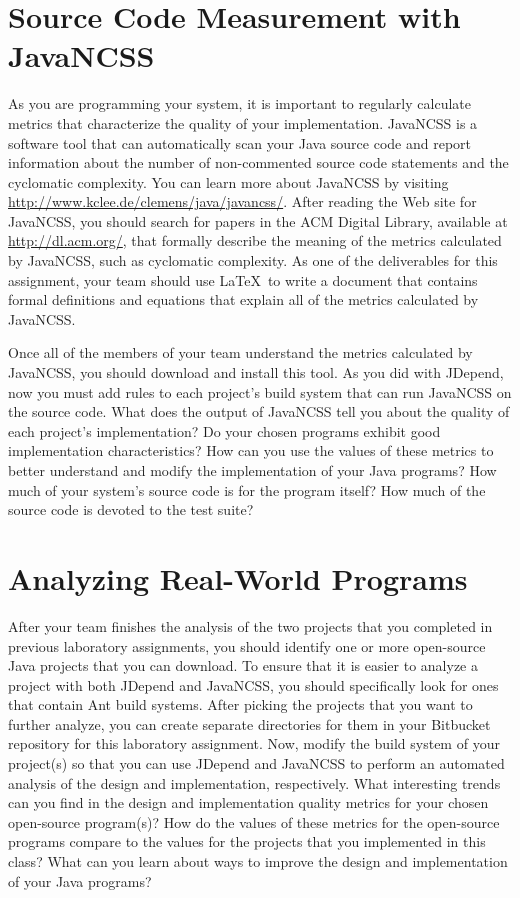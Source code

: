 \section*{Source Code Measurement with JavaNCSS}

As you are programming your system, it is important to regularly calculate metrics that characterize the quality of
your implementation.  JavaNCSS is a software tool that can automatically scan your Java source code and report
information about the number of non-commented source code statements and the cyclomatic complexity.  You can learn more
about JavaNCSS by visiting \url{http://www.kclee.de/clemens/java/javancss/}. After reading the Web site for JavaNCSS,
you should search for papers in the ACM Digital Library, available at \url{http://dl.acm.org/}, that formally describe
the meaning of the metrics calculated by JavaNCSS, such as cyclomatic complexity. As one of the deliverables for this
assignment, your team should use \LaTeX\ to write a document that contains formal definitions and equations that explain
all of the metrics calculated by JavaNCSS.

Once all of the members of your team understand the metrics calculated by JavaNCSS, you should download and install
this tool.  As you did with JDepend, now you must add rules to each project's build system that can run JavaNCSS on the
source code. What does the output of JavaNCSS tell you about the quality of each project's implementation? Do your
chosen programs exhibit good implementation characteristics? How can you use the values of these metrics to better
understand and modify the implementation of your Java programs? How much of your system's source code is for the
program itself? How much of the source code is devoted to the test suite?

\section*{Analyzing Real-World Programs}

After your team finishes the analysis of the two projects that you completed in previous laboratory assignments, you
should identify one or more open-source Java projects that you can download.  To ensure that it is easier to analyze a
project with both JDepend and JavaNCSS, you should specifically look for ones that contain Ant build systems. After
picking the projects that you want to further analyze, you can create separate directories for them in your Bitbucket
repository for this laboratory assignment.  Now, modify the build system of your project(s) so that you can use JDepend
and JavaNCSS to perform an automated analysis of the design and implementation, respectively.  What interesting trends
can you find in the design and implementation quality metrics for your chosen open-source program(s)?  How do the values
of these metrics for the open-source programs compare to the values for the projects that you implemented in this class?
What can you learn about ways to improve the design and implementation of your Java programs?

